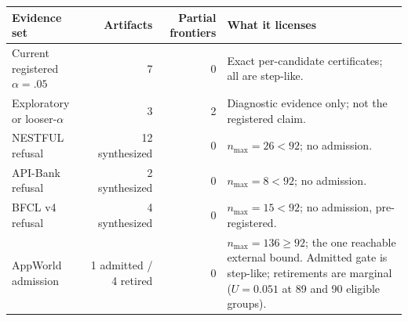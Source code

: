 \begin{tabularx}{\linewidth}{@{}lrr>{\raggedright\arraybackslash}X@{}}
\toprule
Evidence set & Artifacts & Partial frontiers & What it licenses \\
\midrule
Current registered $\alpha=.05$ & 7 & 0 & Exact per-candidate certificates; all are step-like. \\
Exploratory or looser-$\alpha$ & 3 & 2 & Diagnostic evidence only; not the registered claim. \\
NESTFUL refusal & 12 synthesized & 0 & $n_{\max}=26<92$; no admission. \\
API-Bank refusal & 2 synthesized & 0 & $n_{\max}=8<92$; no admission. \\
BFCL v4 refusal & 4 synthesized & 0 & $n_{\max}=15<92$; no admission, pre-registered. \\
AppWorld admission & 1 admitted / 4 retired & 0 & $n_{\max}=136\ge92$; the one reachable external bound. Admitted gate is step-like; retirements are marginal ($U=0.051$ at 89 and 90 eligible groups). \\
\bottomrule
\end{tabularx}
